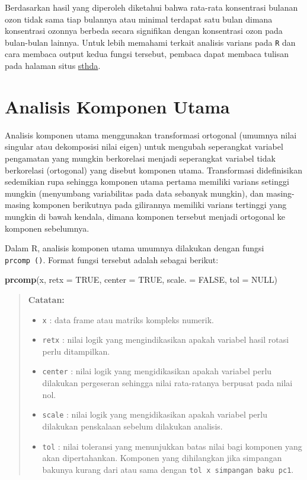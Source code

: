 \documentclass[
]{book}
\newenvironment{Shaded}{\begin{snugshade}}{\end{snugshade}}
\newcommand{\AttributeTok}[1]{\textcolor[rgb]{0.13,0.29,0.53}{#1}}
\newcommand{\ConstantTok}[1]{\textcolor[rgb]{0.56,0.35,0.01}{#1}}
\newcommand{\FunctionTok}[1]{\textcolor[rgb]{0.13,0.29,0.53}{\textbf{#1}}}
\newcommand{\NormalTok}[1]{#1}
\providecommand{\tightlist}{%
  \setlength{\itemsep}{0pt}\setlength{\parskip}{0pt}}
\theoremstyle{definition}
\theoremstyle{definition}
\theoremstyle{definition}
\theoremstyle{definition}
\theoremstyle{remark}
\begin{document}
Berdasarkan hasil yang diperoleh diketahui bahwa rata-rata konsentrasi bulanan ozon tidak sama tiap bulannya atau minimal terdapat satu bulan dimana konsentrasi ozonnya berbeda secara signifikan dengan konsentrasi ozon pada bulan-bulan lainnya. Untuk lebih memahami terkait analisis varians pada \texttt{R} dan cara membaca output kedua fungsi tersebut, pembaca dapat membaca tulisan pada halaman situs \href{http://www.sthda.com/english/wiki/comparing-means-in-r}{sthda}.

\hypertarget{analisis-komponen-utama}{%
\section{Analisis Komponen Utama}\label{analisis-komponen-utama}}

Analisis komponen utama menggunakan transformasi ortogonal (umumnya nilai singular atau dekomposisi nilai eigen) untuk mengubah seperangkat variabel pengamatan yang mungkin berkorelasi menjadi seperangkat variabel tidak berkorelasi (ortogonal) yang disebut komponen utama. Transformasi didefinisikan sedemikian rupa sehingga komponen utama pertama memiliki varians setinggi mungkin (menyumbang variabilitas pada data sebanyak mungkin), dan masing-masing komponen berikutnya pada gilirannya memiliki varians tertinggi yang mungkin di bawah kendala, dimana komponen tersebut menjadi ortogonal ke komponen sebelumnya.

Dalam R, analisis komponen utama umumnya dilakukan dengan fungsi \texttt{prcomp\ ()}. Format fungsi tersebut adalah sebagai berikut:

\begin{Shaded}
\begin{Highlighting}[]
\FunctionTok{prcomp}\NormalTok{(x, }\AttributeTok{retx =} \ConstantTok{TRUE}\NormalTok{, }\AttributeTok{center =} \ConstantTok{TRUE}\NormalTok{, }\AttributeTok{scale. =} \ConstantTok{FALSE}\NormalTok{,}
       \AttributeTok{tol =} \ConstantTok{NULL}\NormalTok{)}
\end{Highlighting}
\end{Shaded}

\begin{quote}
\textbf{Catatan:}

\begin{itemize}
\tightlist
\item
  \texttt{x} : data frame atau matriks kompleks numerik.
\item
  \texttt{retx} : nilai logik yang mengindikasikan apakah variabel hasil rotasi perlu ditampilkan.
\item
  \texttt{center} : nilai logik yang mengidikasikan apakah variabel perlu dilakukan pergeseran sehingga nilai rata-ratanya berpusat pada nilai nol.
\item
  \texttt{scale} : nilai logik yang mengidikasikan apakah variabel perlu dilakukan penskalaan sebelum dilakukan analisis.
\item
  \texttt{tol} : nilai toleransi yang menunjukkan batas nilai bagi komponen yang akan dipertahankan. Komponen yang dihilangkan jika simpangan bakunya kurang dari atau sama dengan \texttt{tol\ x\ simpangan\ baku\ pc1}.
\end{itemize}
\end{quote}
\end{document}
